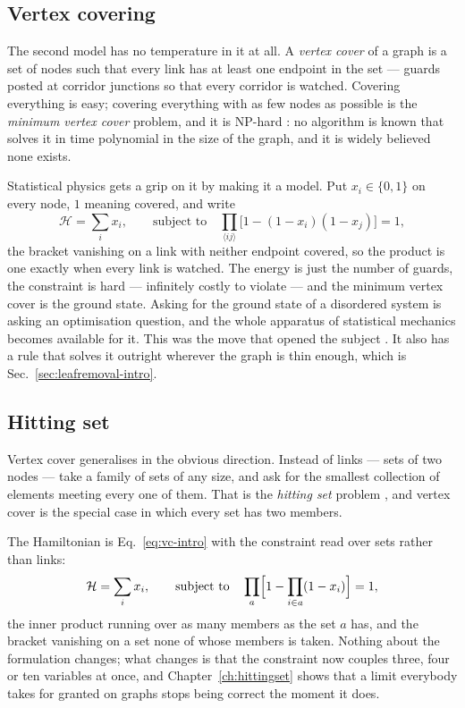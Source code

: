 \subsection{Vertex covering}
\label{sec:cover-intro}

The second model has no temperature in it at all. A \emph{vertex cover} of a graph
is a set of nodes such that every link has at least one endpoint in the set ---
guards posted at corridor junctions so that every corridor is watched. Covering
everything is easy; covering everything with as few nodes as possible is the
\emph{minimum vertex cover} problem, and it is NP-hard \citep{karp1972}: no
algorithm is known that solves it in time polynomial in the size of the graph,
and it is widely believed none exists.

Statistical physics gets a grip on it by making it a model. Put
$x_{i}\in\{0,1\}$ on every node, $1$ meaning covered, and write
\begin{equation}
  \mathcal{H}=\sum_{i}x_{i},
  \qquad\text{subject to}\quad
  \prod_{\langle ij\rangle}\bigl[1-(1-x_{i})(1-x_{j})\bigr]=1,
  \label{eq:vc-intro}
\end{equation}
the bracket vanishing on a link with neither endpoint covered, so the product is
one exactly when every link is watched.
The energy is just the number of guards, the constraint is hard --- infinitely
costly to violate --- and the minimum vertex cover is the ground state. Asking
for the ground state of a disordered system is asking an optimisation question,
and the whole apparatus of statistical mechanics becomes available for it. This
was the move that opened the subject \citep{weigt2000}. It also has a rule that
solves it outright wherever the graph is thin enough, which is
Sec.~\ref{sec:leafremoval-intro}.

\subsection{Hitting set}
\label{sec:hs-intro}

Vertex cover generalises in the obvious direction. Instead of links --- sets of
two nodes --- take a family of sets of any size, and ask for the smallest
collection of elements meeting every one of them. That is the \emph{hitting set}
problem \citep{mezard2007}, and vertex cover is the special case in which every
set has two members.

The Hamiltonian is Eq.~\eqref{eq:vc-intro} with the constraint read over sets
rather than links:
\begin{equation}
  \mathcal{H}=\sum_{i}x_{i},
  \qquad\text{subject to}\quad
  \prod_{a}\Bigl[1-\prod_{i\in a}(1-x_{i})\Bigr]=1,
  \label{eq:hs-intro}
\end{equation}
the inner product running over as many members as the set $a$ has, and the
bracket vanishing on a set none of whose members is taken.
Nothing about the formulation changes; what changes is that the constraint now
couples three, four or ten variables at once, and Chapter~\ref{ch:hittingset}
shows that a limit everybody takes for granted on graphs stops being correct the
moment it does.

